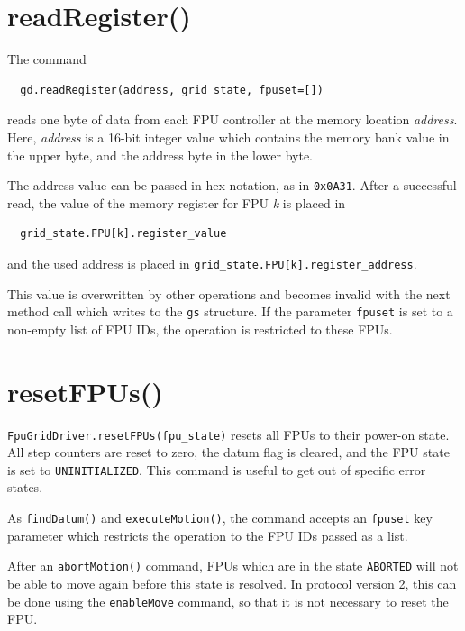 \documentclass[fontsize=12,a4paper]{scrreprt}
\begin{document}
\section{readRegister()}
\label{sec:readregister}

The command

\begin{verbatim}
  gd.readRegister(address, grid_state, fpuset=[])
\end{verbatim}
reads one byte of data from each FPU controller
at the memory location \emph{address}. Here,
\emph{address} is a 16-bit integer value
which contains the memory bank value in the
upper byte, and the address byte in the lower byte.

The address value can be passed in hex notation,
as in \texttt{0x0A31}. After a successful read,
the value of the memory register for FPU \emph{k}
is placed in

\begin{verbatim}
  grid_state.FPU[k].register_value
\end{verbatim}
and the used address is placed in
\verb+grid_state.FPU[k].register_address+.


This value is overwritten by other operations and becomes invalid with
the next method call which writes to the \texttt{gs} structure.  If
the parameter \texttt{fpuset} is set to a non-empty list of FPU IDs,
the operation is restricted to these FPUs.

\section{resetFPUs()}

\texttt{FpuGridDriver.resetFPUs(fpu\_state)} resets all FPUs to their
power-on state. All step counters are reset to zero, the datum flag is
cleared, and the FPU state is set to \texttt{UNINITIALIZED}. This
command is useful to get out of specific error states.

As \texttt{findDatum()} and \texttt{executeMotion()}, the command
accepts an \texttt{fpuset} key parameter which restricts the operation
to the FPU IDs passed as a list.

After an \texttt{abortMotion()} command, FPUs which are in the state
\texttt{ABORTED} will not be able to move again before this state is
resolved. In protocol version 2, this can be done using the
\texttt{enableMove} command, so that it is not necessary to reset the
FPU.
\end{document}
